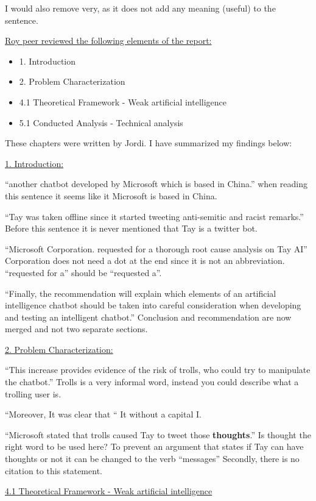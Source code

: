 I would also remove very, as it does not add any meaning (useful) to the sentence.

\underline{Roy peer reviewed the following elements of the report:}

\begin{itemize}
    \item 1. Introduction
    \item 2. Problem Characterization
    \item 4.1 Theoretical Framework - Weak artificial intelligence
    \item 5.1 Conducted Analysis - Technical analysis
\end{itemize}

These chapters were written by Jordi. I have summarized my findings below:

\underline{1. Introduction:}

“another chatbot developed by Microsoft which is based in China.” when reading this sentence it seems like it Microsoft is based in China.

“Tay was taken offline since it started tweeting anti-semitic and racist remarks.” Before this sentence it is never mentioned that Tay is a twitter bot.

“Microsoft Corporation. requested for a thorough root cause analysis on Tay AI” Corporation does not need a dot at the end since it is not an abbreviation.
“requested for a” should be “requested a”.

“Finally, the recommendation will explain which elements of an artificial intelligence chatbot should be taken into careful consideration when developing and testing an intelligent chatbot.” Conclusion and recommendation are now merged and not two separate sections.

\underline{2. Problem Characterization:}

“This increase provides evidence of the risk of trolls, who could try to manipulate the chatbot.” Trolls is a very informal word, instead you could describe what a trolling user is.

“Moreover, It was clear that “ It without a capital I.

“Microsoft stated that trolls caused Tay to tweet those \textbf{thoughts}.” Is thought the right word to be used here? To prevent an argument that states if Tay can have thoughts or not it can be changed to the verb “messages”
Secondly, there is no citation to this statement.

\underline{4.1 Theoretical Framework - Weak artificial intelligence}

